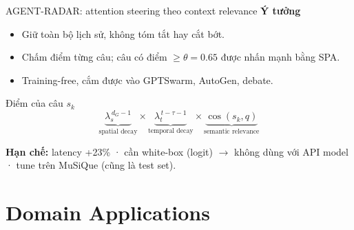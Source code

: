 \documentclass[aspectratio=169,10pt]{beamer}
\begin{document}
\begin{frame}{AGENT-RADAR: attention steering theo context relevance}
  \textbf{Ý tưởng}
  \begin{itemize}
    \item Giữ toàn bộ lịch sử, không tóm tắt hay cắt bớt.
    \item Chấm điểm từng câu; câu có điểm $\ge \theta = 0.65$ được nhấn mạnh bằng SPA.
    \item Training-free, cắm được vào GPTSwarm, AutoGen, debate.
  \end{itemize}
  \begin{block}{Điểm của câu $s_k$}
    \[ \underbrace{\lambda_s^{\,d_G - 1}}_{\text{spatial decay}} \times
       \underbrace{\lambda_t^{\,t-\tau-1}}_{\text{temporal decay}} \times
       \underbrace{\cos(s_k, q)}_{\text{semantic relevance}} \]
  \end{block}
  \textbf{Hạn chế:} latency +23\% · cần white-box (logit) $\to$ không dùng với API model ·
  tune trên MuSiQue (cũng là test set).
\end{frame}

\section{Domain Applications}
\end{document}
